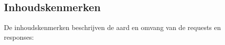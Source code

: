 
    
    
    

\subsection{Inhoudskenmerken} 
\label{subsec:inhoudskenmerken}

De inhoudskenmerken beschrijven de aard en omvang van de requests en responses:

